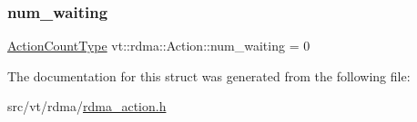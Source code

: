 \subsubsection{\texorpdfstring{num\+\_\+waiting}{num\_waiting}}
{\footnotesize\ttfamily \hyperlink{structvt_1_1rdma_1_1_action_a7c893809966c9c8c871002d5283728f0}{Action\+Count\+Type} vt\+::rdma\+::\+Action\+::num\+\_\+waiting = 0}



The documentation for this struct was generated from the following file\+:\begin{DoxyCompactItemize}
\item 
src/vt/rdma/\hyperlink{rdma__action_8h}{rdma\+\_\+action.\+h}\end{DoxyCompactItemize}
